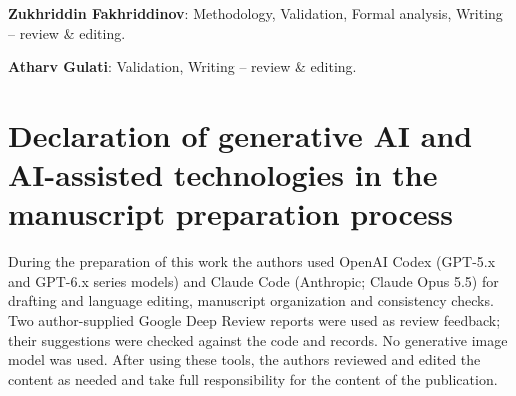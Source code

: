 \noindent\textbf{Zukhriddin Fakhriddinov}: Methodology, Validation, Formal analysis, Writing -- review \& editing.

\noindent\textbf{Atharv Gulati}: Validation, Writing -- review \& editing.

\section*{Declaration of generative AI and AI-assisted technologies in the manuscript preparation process}
During the preparation of this work the authors used OpenAI Codex (GPT-5.x and GPT-6.x series models) and Claude Code (Anthropic; Claude Opus 5.5) for drafting and language editing, manuscript organization and consistency checks. Two author-supplied Google Deep Review reports were used as review feedback; their suggestions were checked against the code and records. No generative image model was used. After using these tools, the authors reviewed and edited the content as needed and take full responsibility for the content of the publication.
